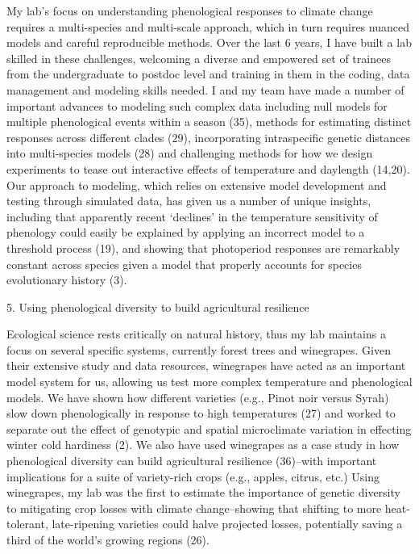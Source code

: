 \documentclass[12pt,oneside]{article}
\begin{document}
My lab's focus on understanding phenological responses to climate change requires a multi-species and multi-scale approach, which in turn requires nuanced models and careful reproducible methods. Over the last 6 years, I have built a lab skilled in these challenges, welcoming a diverse and empowered set of trainees from the undergraduate to postdoc level and training in them in the coding, data management and modeling skills needed. I and my team have made a number of important advances to modeling such complex data including null models for multiple phenological events within a season (35), methods for estimating distinct responses across different clades (29), incorporating intraspecific genetic distances into multi-species models (28) and challenging methods for how we design experiments to tease out interactive effects of temperature and daylength (14,20). Our approach to modeling, which relies on extensive model development and testing through simulated data, has given us a number of unique insights, including that apparently recent `declines' in the temperature sensitivity of phenology could easily be explained by applying an incorrect model to a threshold process (19), and showing that photoperiod responses are remarkably constant across species given a model that properly accounts for species evolutionary history (3).

5. Using phenological diversity to build agricultural resilience

Ecological science rests critically on natural history, thus my lab maintains a focus on several specific systems, currently forest trees and winegrapes. Given their extensive study and data resources, winegrapes have acted as an important model system for us, allowing us test more complex temperature and phenological models. We have shown how different varieties (e.g., Pinot noir versus Syrah) slow down phenologically in response to high temperatures (27) and worked to separate out the effect of genotypic and spatial microclimate variation in effecting winter cold hardiness (2). We also have used winegrapes as a case study in how phenological diversity can build agricultural resilience (36)--with important implications for a suite of variety-rich crops (e.g., apples, citrus, etc.) Using winegrapes, my lab was the first to estimate the importance of genetic diversity to mitigating crop losses with climate change--showing that shifting to more heat-tolerant, late-ripening varieties could halve projected losses, potentially saving a third of the world's growing regions (26).\\
\end{document}
